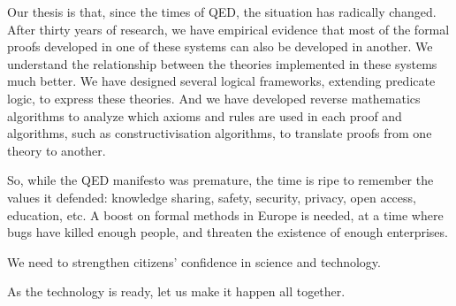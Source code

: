 Our thesis is that, since the times of QED, the situation has radically
changed. After thirty years of research, we have empirical evidence
that most of the formal proofs developed in one of these systems can
also be developed in another. We understand the relationship between
the theories implemented in these systems much better. We have
designed several logical frameworks, extending predicate logic, to express
these theories. And we have developed reverse
mathematics algorithms to analyze which axioms and rules are used in
each proof and algorithms, such as constructivisation algorithms, to
translate proofs from one theory to another.

So, while the QED manifesto was premature, the time is ripe to
remember the values it defended: knowledge sharing, safety, security,
privacy, open access, education, etc. A boost on formal methods in
Europe is needed, at a time where bugs have killed enough people, and
threaten the existence of enough enterprises.

We need to strengthen citizens' confidence in science and technology.

As the technology is ready, let us make it happen all together.

